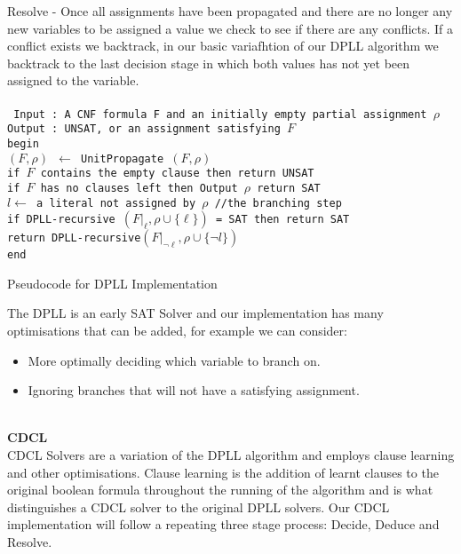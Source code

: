\documentclass[12pt,a4paper]{article}
\begin{document}
Resolve - Once all assignments have been propagated and there are no longer any new variables to be assigned a value we check to see if there are any conflicts. If a conflict exists we backtrack, in our basic variafhtion of our DPLL algorithm we backtrack to the last decision stage in which both values has not yet been assigned to the variable.\\\\
\texttt{
Input : A CNF formula F and an initially empty partial assignment $\rho$ \\
Output : UNSAT, or an assignment satisfying $F$\\
begin\\
\hspace*{1cm}$(F,\rho)$ $\leftarrow$ UnitPropagate $(F,\rho)$\\
\hspace*{1cm}if $F$ contains the empty clause then return UNSAT\\
\hspace*{1cm}if $F$ has no clauses left then Output $\rho$ return SAT\\
\hspace*{1cm}$l \leftarrow$ a literal not assigned by $\rho$  //the branching step \\
\hspace*{1cm}if DPLL-recursive $(F |_\ell,\rho \cup \{\ell\})$ = SAT then return SAT\\
\hspace*{1cm}return DPLL-recursive$(F |_{\neg\ell},\rho \cup \{\neg l \})$ \\
end
}
\begin{center}Pseudocode for DPLL Implementation \cite[p. 93]{DPLL-Implementation} \end{center}
The DPLL is an early SAT Solver and our implementation has many optimisations that can be added, for example we can consider: 
\begin{itemize}
	\item{More optimally deciding which variable to branch on.}
	\item{Ignoring branches that will not have a satisfying assignment.}
\end{itemize}
\hfill\\
{\bf CDCL}\\
CDCL Solvers are a variation of the DPLL algorithm and employs clause learning and other optimisations. Clause learning is the addition of learnt clauses to the original boolean formula throughout the running of the algorithm and is what distinguishes a CDCL solver to the original DPLL solvers. Our CDCL implementation will follow a repeating three stage process: Decide, Deduce and Resolve. 
\end{document}
